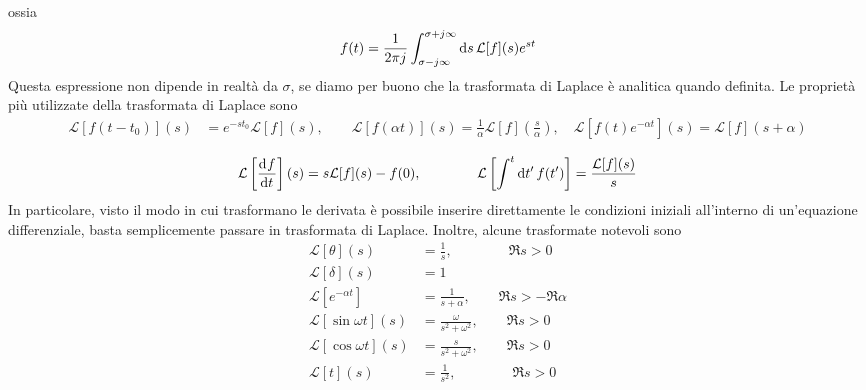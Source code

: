 \documentclass[a4paper, 11pt]{article}
\begin{document}
	ossia
	\[f(t)=\frac{1}{2\pi j}\int_{\sigma-j\infty}^{\sigma+j\infty}\mathrm{d} s\,\mathcal{L}[f](s)e^{st}\]
	Questa espressione non dipende in realtà da $\sigma$, se diamo per buono che la trasformata di Laplace è analitica quando definita. Le proprietà più utilizzate della trasformata di Laplace sono
	\begin{align*}
		\mathcal{L}[f(t-t_0)](s)&=e^{-st_0}\mathcal{L}[f](s),\qquad\mathcal{L}[f(\alpha t)](s)=\frac{1}{\alpha}\mathcal{L}[f]\left(\frac{s}{\alpha}\right),\quad\mathcal{L}[f(t)e^{-\alpha t}](s)=\mathcal{L}[f](s+\alpha)\\
	\end{align*} 
	\[\mathcal{L}\left[\dfrac{\mathrm{d} ^{}f}{\mathrm{d} {t}^{}}\right](s)=s\mathcal{L}[f](s)-f(0),\qquad\qquad\mathcal{L}\left[\int^t\mathrm{d} t'\, f(t')\right]=\frac{\mathcal{L}[f](s)}{s}\]
	In particolare, visto il modo in cui trasformano le derivata è possibile inserire direttamente le condizioni iniziali all'interno di un'equazione differenziale, basta semplicemente passare in trasformata di Laplace. Inoltre, alcune trasformate notevoli sono
	\begin{align*}
		\mathcal{L}[\theta](s)&=\frac{1}{s},\qquad\qquad\Re s>0\\\mathcal{L}[\delta](s)&=1\\
		\mathcal{L}[e^{-\alpha t}]&=\frac{1}{s+\alpha},\qquad \Re s>-\Re\alpha\\
		\mathcal{L}[\sin\omega t](s)&=\frac{\omega}{s^2+\omega^2},\qquad\Re s>0\\
		\mathcal{L}[\cos\omega t](s)&=\frac{s}{s^2+\omega^2},\qquad\Re s>0\\
		\mathcal{L}\left[t\right](s)&=\frac{1}{s^2},\qquad\qquad\Re s>0
	\end{align*}
\end{document}
